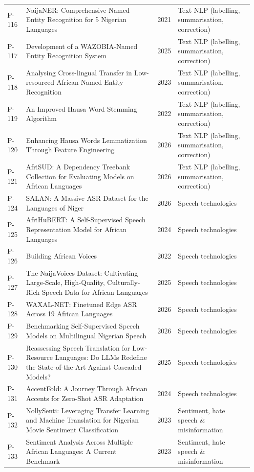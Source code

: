 \begin{longtable}{@{}p{} p{} p{} p{}@{}}
P-116 & NaijaNER: Comprehensive Named Entity Recognition for 5 Nigerian Languages & 2021 & Text NLP (labelling, summarisation, correction) \\
P-117 & Development of a WAZOBIA-Named Entity Recognition System & 2025 & Text NLP (labelling, summarisation, correction) \\
P-118 & Analysing Cross-lingual Transfer in Low-resourced African Named Entity Recognition & 2023 & Text NLP (labelling, summarisation, correction) \\
P-119 & An Improved Hausa Word Stemming Algorithm & 2022 & Text NLP (labelling, summarisation, correction) \\
P-120 & Enhancing Hausa Words Lemmatization Through Feature Engineering & 2026 & Text NLP (labelling, summarisation, correction) \\
P-121 & AfriSUD: A Dependency Treebank Collection for Evaluating Models on African Languages & 2026 & Text NLP (labelling, summarisation, correction) \\
P-124 & SALAN: A Massive ASR Dataset for the Languages of Niger & 2026 & Speech technologies \\
P-125 & AfriHuBERT: A Self-Supervised Speech Representation Model for African Languages & 2024 & Speech technologies \\
P-126 & Building African Voices & 2022 & Speech technologies \\
P-127 & The NaijaVoices Dataset: Cultivating Large-Scale, High-Quality, Culturally-Rich Speech Data for African Languages & 2025 & Speech technologies \\
P-128 & WAXAL-NET: Finetuned Edge ASR Across 19 African Languages & 2026 & Speech technologies \\
P-129 & Benchmarking Self-Supervised Speech Models on Multilingual Nigerian Speech & 2026 & Speech technologies \\
P-130 & Reassessing Speech Translation for Low-Resource Languages: Do LLMs Redefine the State-of-the-Art Against Cascaded Models? & 2025 & Speech technologies \\
P-131 & AccentFold: A Journey Through African Accents for Zero-Shot ASR Adaptation & 2024 & Speech technologies \\
P-132 & NollySenti: Leveraging Transfer Learning and Machine Translation for Nigerian Movie Sentiment Classification & 2023 & Sentiment, hate speech \& misinformation \\
P-133 & Sentiment Analysis Across Multiple African Languages: A Current Benchmark & 2023 & Sentiment, hate speech \& misinformation \\

\end{longtable}

